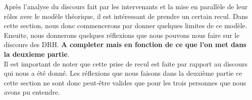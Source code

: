 Après l'analyse du discours fait par les intervenants et la mise en parallèle de leur rôles avec le modèle théorique, il est intéressant de prendre un certain recul. Dans cette section, nous donc commencerons par donner quelques limites de ce modèle. Ensuite, nous donnerons quelques  réflexions que nous pouvons nous faire sur le discours des DRH. \textbf{A completer mais en fonction de ce que l'on met dans la deuxieme partie}.\\

Il est important de noter que cette prise de recul est faite par rapport au discours qui nous a été donné. Les réflexions que nous faisons dans la deuxième partie ce cette section ne sont donc peut-être valides que pour les trois personnes que nous avons pu entendre. \\